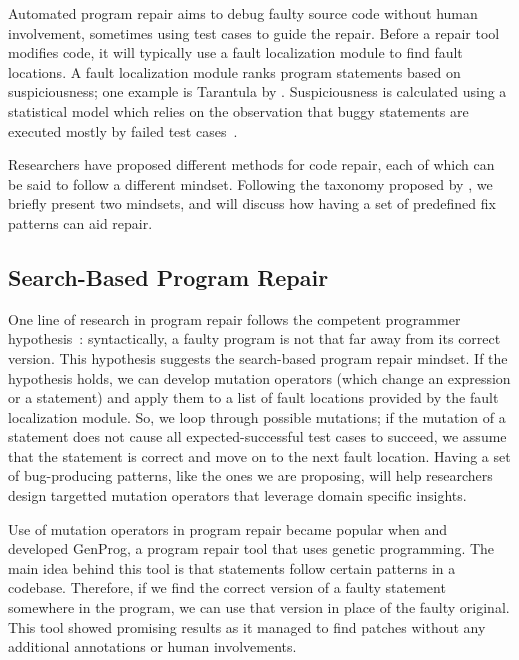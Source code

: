 Automated program repair aims to debug faulty source code without human involvement, sometimes using test cases to guide the repair. Before a repair tool modifies code, it will typically use a fault localization module to find fault locations. A fault localization module ranks program statements based on suspiciousness; one example is Tarantula by \cite{jones2005empirical}. Suspiciousness is calculated using a statistical model which relies on the observation that buggy statements are executed mostly by failed test cases~\citep{naish2009spectral,xie2013theoretical}.

Researchers have proposed different methods for code repair, each of which can be said to follow a different mindset. Following the taxonomy proposed by \cite{liu2018survey}, we briefly present two mindsets, and will discuss how having a set of predefined fix patterns can aid repair.

\subsection{Search-Based Program Repair}
One line of research in program repair follows the competent programmer hypothesis~\citep{gopinath2014mutant}: syntactically, a faulty program is not that far away from its correct version. This hypothesis suggests the search-based program repair mindset. If the hypothesis holds, we can develop mutation operators (which change an expression or a statement) and apply them to a list of fault locations provided by the fault localization module. So, we loop through possible mutations; if the mutation of a statement does not cause all expected-successful test cases to succeed, we assume that the statement is correct and move on to the next fault location. Having a set of bug-producing patterns, like the ones we are proposing, will help researchers design targetted mutation operators that leverage domain specific insights.

Use of mutation operators in program repair became popular when \cite{forrest2009genetic} and \cite{nguyen2009using} developed GenProg, a program repair tool that uses genetic programming. The main idea behind this tool is that statements follow certain patterns in a codebase. Therefore, if we find the correct version of a faulty statement somewhere in the program, we can use that version in place of the faulty original. This tool showed promising results as it managed to find patches without any additional annotations or human involvements.

